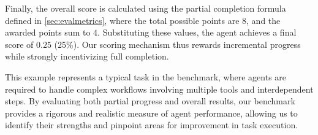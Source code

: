 Finally, the overall score is calculated using the partial completion formula defined in \autoref{sec:evalmetrics}, where the total possible points are \( 8 \), and the awarded points sum to \( 4 \). Substituting these values, the agent achieves a final score of \( 0.25 \) (25\%).  Our scoring mechanism thus rewards incremental progress while strongly incentivizing full completion. 

This example represents a typical task in the \tac benchmark, where agents are required to handle complex workflows involving multiple tools and interdependent steps. By evaluating both partial progress and overall results, our benchmark provides a rigorous and realistic measure of agent performance, allowing us to identify their strengths and pinpoint areas for improvement in task execution.




